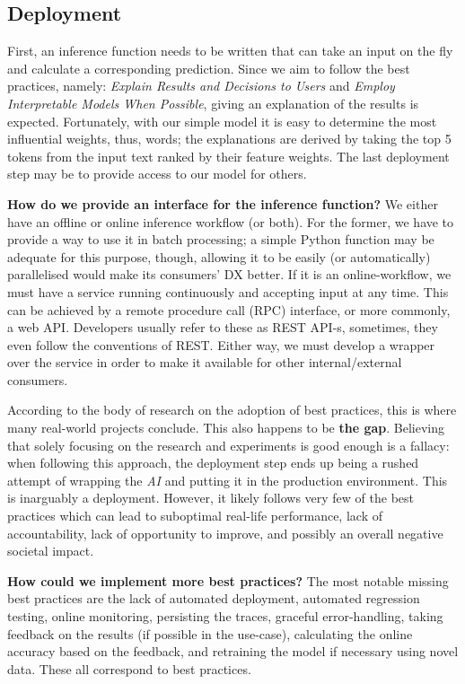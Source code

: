 \subsection{Deployment}

First, an inference function needs to be written that can take an input on the fly and calculate a corresponding prediction. Since we aim to follow the best practices, namely: \textit{Explain Results and Decisions to Users} and \textit{Employ Interpretable Models When Possible}, giving an explanation of the results is expected. Fortunately, with our simple model it is easy to determine the most influential weights, thus, words; the explanations are derived by taking the top 5 tokens from the input text ranked by their feature weights. The last deployment step may be to provide access to our model for others.

\begin{displayquote}
\textbf{How do we provide an interface for the inference function?} We either have an offline or online inference workflow (or both). For the former, we have to provide a way to use it in batch processing; a simple Python function may be adequate for this purpose, though, allowing it to be easily (or automatically) parallelised would make its consumers' DX better. If it is an online-workflow, we must have a service running continuously and accepting input at any time. This can be achieved by a remote procedure call (RPC) interface, or more commonly, a web API. Developers usually refer to these as REST API-s, sometimes, they even follow the conventions of REST. Either way, we must develop a wrapper over the service in order to make it available for other internal/external consumers.
\end{displayquote}

According to the body of research on the adoption of best practices, this is where many real-world projects conclude. This also happens to be \textbf{the gap}. Believing that solely focusing on the research and experiments is good enough is a fallacy: when following this approach, the deployment step ends up being a rushed attempt of wrapping the \textit{AI} and putting it in the production environment. This is inarguably a deployment. However, it likely follows very few of the best practices which can lead to suboptimal real-life performance, lack of accountability, lack of opportunity to improve, and possibly an overall negative societal impact.

\begin{displayquote}
\textbf{How could we implement more best practices?} The most notable missing best practices are the lack of automated deployment, automated regression testing, online monitoring, persisting the traces, graceful error-handling, taking feedback on the results (if possible in the use-case), calculating the online accuracy based on the feedback, and retraining the model if necessary using novel data. These all correspond to best practices.
\end{displayquote}


